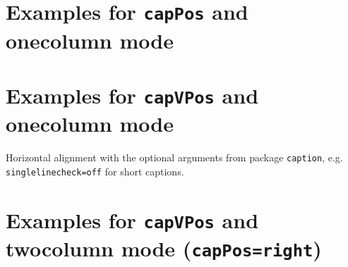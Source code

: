 \documentclass[twoside,DIV=13]{scrartcl}
\let\OrigBlindtext\blindtext
\def\myblindtext{\TeX\ is a typesetting language. Instead of visually formatting your text, you enter y
our manuscript text intertwined with \TeX\ commands in a plain text file. You then run \TeX\ to 
produce formatted output, such as a PDF file. %
}
\begin{document}
\tableofcontents

\newpage

\section{Examples for \texttt{capPos} and onecolumn mode}
\let\NewColumn\clearpage
\let\blindtext\myblindtext


\section{Examples for \texttt{capVPos} and onecolumn mode }
Horizontal alignment with the optional arguments from package \texttt{caption}, e.g. \texttt{singlelinecheck=off} for short captions.




\let\NewColumn\columnbreak


\let\blindtext\OrigBlindtext
\section{Examples for \texttt{capVPos} and twocolumn mode (\texttt{capPos=right})}
\let\NewColumn\columnbreak

\end{document}
